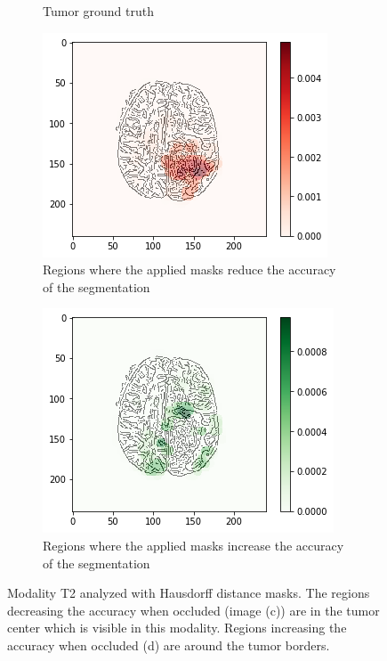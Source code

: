 \begin{figure}[H]
\begin{subfigure}[t]{.4\textwidth}
        \caption{Tumor ground truth}
    \end{subfigure}
    \begin{subfigure}[t]{.45\textwidth}
        \centering
        \includegraphics[width=\linewidth]{chapters/06_hdm/b_Brats18_TCIA08_242_1_L2/33.png}
        \caption{Regions where the applied masks reduce the accuracy of the segmentation}
    \end{subfigure}\hspace{1cm}%
    \begin{subfigure}[t]{.45\textwidth}
        \centering
        \includegraphics[width=\linewidth]{chapters/06_hdm/b_Brats18_TCIA08_242_1_L2/34.png}
        \caption{Regions where the applied masks increase the accuracy of the segmentation}
    \end{subfigure}
    \caption{Modality T2 analyzed with Hausdorff distance masks. The regions decreasing the accuracy when occluded (image (c)) are in the tumor center which is visible in this modality. Regions increasing the accuracy when occluded (d) are around the tumor borders.}
\end{figure}

